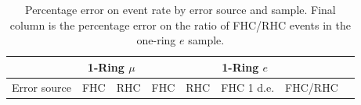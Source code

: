 \begin{table}[H]
	\centering
	\begin{tabular}{|l||l|l||l|l|l|l|l|}
		\hline
		& \multicolumn{2}{c||}{\textbf{1-Ring $\mu$}} & \multicolumn{4}{c|}{\textbf{1-Ring $e$}} \\ \hline
		Error source & FHC & RHC & FHC & RHC & FHC 1 d.e. & FHC/RHC \\ \hline\hline
		
		
		
		
		
		
		\hline
		
		
	\end{tabular}
	\caption
	{
	Percentage error on event rate by error source and sample. Final column is the percentage error on the ratio of FHC/RHC events in the one-ring $e$ sample.
	}
	\label{tab:sk_errors_summary}
\end{table}
